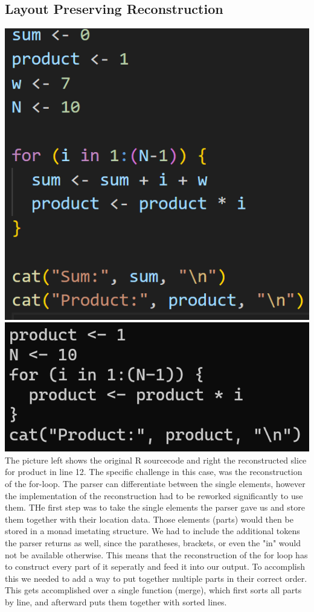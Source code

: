 \documentclass[a3paper, portrait, english, default]{uulm-cs-poster}
\begin{document}
\begin{multicols}{2}
\section*{Layout Preserving Reconstruction}
	\includegraphics{Screenshot 2024-01-26 131317.png}
	\includegraphics{Screenshot 2024-01-26 132150.png}
	The picture left shows the original R sourcecode and right the reconstructed slice for product in line 12. The specific challenge in this case, was the reconstruction of the for-loop. The parser can differentiate between the single elements, however the implementation of the reconstruction had to be reworked significantly to use them. THe first step was to take the single elements the parser gave us and store them together with their location data. Those elements (parts) would then be stored in a monad imetating structure. We had to include the additional tokens the parser returns as well, since the paratheses, brackets, or even the "in" would not be available otherwise. This means that the reconstruction of the for loop has to construct every part of it seperatly and feed it into our output. To accomplish this we needed to add a way to put together multiple parts in their correct order. This gets accomplished over a single function (merge), which first sorts all parts by line, and afterward puts them together with sorted lines.\\

\end{multicols}
\end{document}
